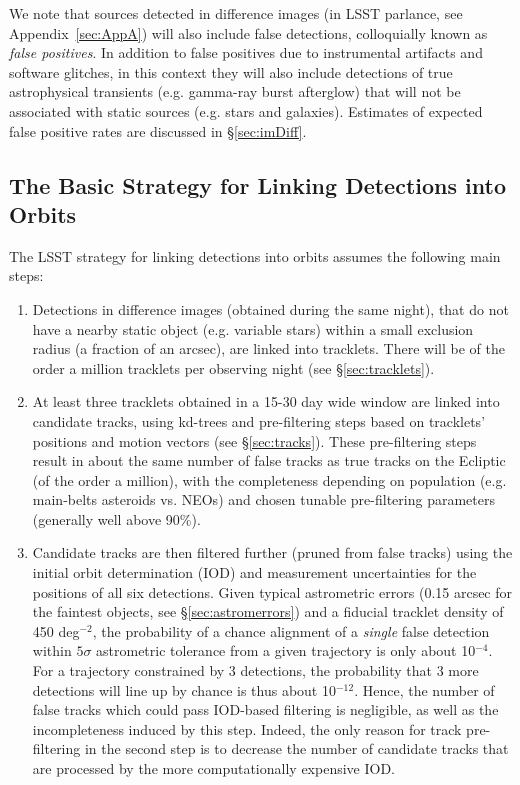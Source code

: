 We note that sources detected in difference images (\DIASources in LSST parlance, see Appendix~\ref{sec:AppA})
will also include false detections, colloquially known as {\it false positives}.
In addition to false positives due to instrumental artifacts and software glitches,
in this context they will also include detections of true astrophysical transients
(e.g. gamma-ray burst afterglow) that will not be associated with static sources
(e.g. stars and galaxies). Estimates of expected false positive rates are discussed
in \S\ref{sec:imDiff}.



\subsection{The Basic Strategy for Linking Detections into Orbits}

The LSST strategy for linking detections into orbits assumes the following main steps:
\begin{enumerate}
\item Detections in difference images (obtained during the same night), that do not
         have a nearby static object (e.g. variable stars) within a small exclusion radius
         (a fraction of an arcsec), are linked into tracklets. There will be of the order
         a million tracklets per observing night (see \S\ref{sec:tracklets}).
\item At least three tracklets obtained in a 15-30 day wide window are linked into
         candidate tracks, using kd-trees and pre-filtering steps based on tracklets' positions
         and motion vectors (see \S\ref{sec:tracks}). These pre-filtering steps result in
         about the same number of false tracks as true tracks on the Ecliptic (of the order
         a million), with the completeness depending on population (e.g. main-belts
         asteroids vs. NEOs) and chosen tunable pre-filtering parameters (generally well above 90\%).
\item Candidate tracks are then filtered further (pruned from false tracks) using the initial orbit
         determination (IOD) and measurement uncertainties for the positions of all six
         detections. Given typical astrometric errors (0.15 arcsec for the faintest objects,
         see \S\ref{sec:astromerrors})
         and a fiducial tracklet density of 450 deg$^{-2}$, the probability of a chance alignment
         of a {\it single} false detection within $5\sigma$ astrometric tolerance from a given
         trajectory is only about 10$^{-4}$. For a trajectory constrained by 3 detections, the
         probability that 3 more detections will line up by chance is thus about 10$^{-12}$. Hence,
         the number of false tracks which could pass IOD-based filtering is negligible, as well as
         the incompleteness induced by this step. Indeed, the only reason for track pre-filtering
         in the second step is to decrease the number of candidate tracks that are processed
         by the more computationally expensive IOD.
\end{enumerate}

